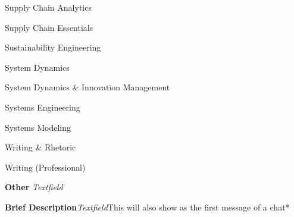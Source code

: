 \begin{CompactItemize}[leftmargin = *]
\begin{CompactItemize}
\begin{CompactItemize}
\begin{CompactItemize}
                \item Supply Chain Analytics
                \item Supply Chain Essentials
                \item Sustainability Engineering
                \item System Dynamics
                \item System Dynamics \& Innovation Management
                \item Systems Engineering
                \item Systems Modeling
                \item Writing \& Rhetoric
                \item Writing (Professional)
            \end{CompactItemize}
        \end{CompactItemize}
        \item \textbf{Other} \quad\textit{Textfield}
    \end{CompactItemize}
    \item \textbf{Brief Description}\quad\textit{Textfield}\qquad *This will also show as the first message of a chat*
\end{CompactItemize}
